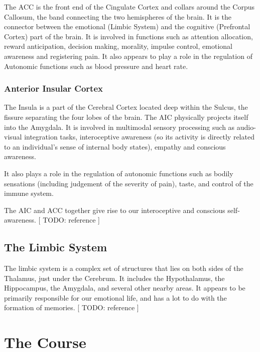 \documentclass[twocolumn]{article}
\begin{document}
The ACC is the front end of the Cingulate Cortex and collars around the Corpus
Callosum, the band connecting the two hemispheres of the brain. It is the connector
between the emotional (Limbic System) and the cognitive (Prefrontal Cortex) part of
the brain. It is involved in functions such as attention allocation, reward
anticipation, decision making, morality, impulse control, emotional awareness and
registering pain. \cite{accstroop,accreward,snmorality,empathypain,acccognitive} It
also appears to play a role in the regulation of Autonomic functions such as blood
pressure and heart rate. \cite{accbloodpressure}

\subsubsection{Anterior Insular Cortex}

The Insula is a part of the Cerebral Cortex located deep within the Sulcus, the
fissure separating the four lobes of the brain. The AIC physically projects itself
into the Amygdala. It is involved in multimodal sensory processing such as
audio-visual integration tasks, interoceptive awareness (so its activity is directly
related to an individual's sense of internal body states), empathy and conscious
awareness. \cite{aicemotion}

It also plays a role in the regulation of autonomic functions such as bodily
sensations (including judgement of the severity of pain), taste, and control of the
immune system. \cite{aicautonomic}

The AIC and ACC together give rise to our interoceptive and conscious
self-awareness. [ TODO: reference ]

\subsection{The Limbic System}

The limbic system is a complex set of structures that lies on both sides of the
Thalamus, just under the Cerebrum. It includes the Hypothalamus, the Hippocampus, the
Amygdala, and several other nearby areas. It appears to be primarily responsible for
our emotional life, and has a lot to do with the formation of memories. [ TODO:
  reference ]

\section{The Course}
\end{document}
